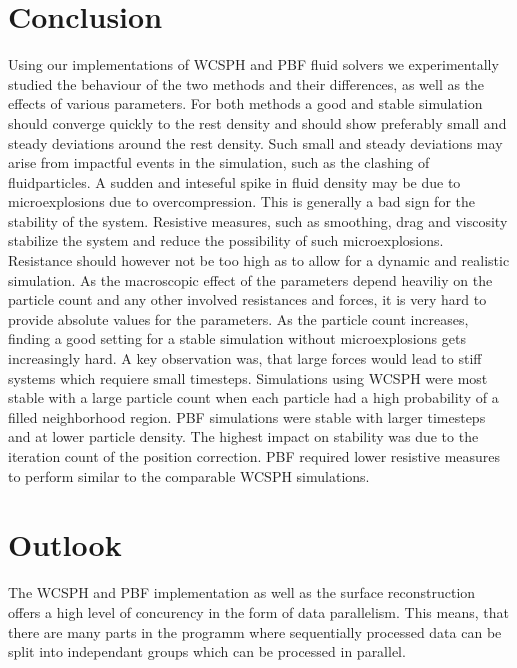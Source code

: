 \documentclass[11pt, letterpaper, twocolumn]{article}
\begin{document}
\section{Conclusion}
\label{sec:conclusion}
Using our implementations of WCSPH and PBF fluid solvers we experimentally studied the behaviour of the two methods and their differences, as well as the effects of various parameters. For both methods a good and stable simulation should converge quickly to the rest density and should show preferably small and steady deviations around the rest density. Such small and steady deviations may arise from impactful events in the simulation, such as the clashing of fluidparticles.
A sudden and inteseful spike in fluid density may be due to microexplosions due to overcompression. This is generally a bad sign for the stability of the system.
Resistive measures, such as smoothing, drag and viscosity stabilize the system and reduce the possibility of such microexplosions. Resistance should however not be too high as to allow for a dynamic and realistic simulation.
As the macroscopic effect of the parameters depend heaviliy on the particle count and any other involved resistances and forces, it is very hard to provide absolute values for the parameters. As the particle count increases, finding a good setting for a stable simulation without microexplosions gets increasingly hard.
A key observation was, that large forces would lead to stiff systems which requiere small timesteps.
Simulations using WCSPH were most stable with a large particle count when each particle had a high probability of a filled neighborhood region. 
PBF simulations were stable with larger timesteps and at lower particle density. The highest impact on stability was due to the iteration count of the position correction. PBF required lower resistive measures to perform similar to the comparable WCSPH simulations.


\section{Outlook}
\label{sec:future}
The WCSPH and PBF implementation as well as the surface reconstruction offers a high level of concurency in the form of data parallelism. This means, that there are many parts in the programm where sequentially processed data can be split into independant groups which can be processed in parallel.

\end{document}
